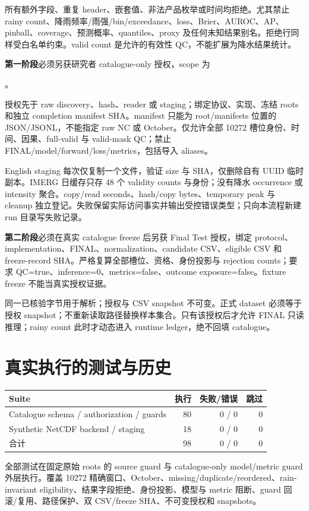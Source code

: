 \documentclass[11pt,a4paper]{ctexart}
\newcommand{\code}[1]{\texttt{\detokenize{#1}}}
\begin{document}
所有额外字段、重复 header、嵌套值、非法产品枚举或时间均拒绝。尤其禁止 rainy count、降雨频率/雨强/bin/exceedance、loss、Brier、AUROC、AP、pinball、coverage、预测概率、quantiles、proxy 及任何未知结果别名。拒绝行同样受白名单约束。valid count 是允许的有效性 QC，不能扩展为降水结果统计。

\textbf{第一阶段}必须另获研究者 catalogue-only 授权，scope 为\par
\code{B0_2025_FINAL_TEST_CATALOGUE_ONLY}。\par
授权先于 raw discovery、hash、reader 或 staging；绑定协议、实现、冻结 roots 和独立 completion manifest SHA。manifest 只能为 root/manifests 位置的 JSON/JSONL，不能指定 raw NC 或 October。仅允许全部 10272 槽位身份、时间、因果、full-valid 与 valid-mask QC；禁止 FINAL/model/forward/loss/metrics，包括导入 aliases。

English staging 每次仅复制一个文件，验证 size 与 SHA，仅删除自有 UUID 临时副本。IMERG 日缓存只存 48 个 validity counts 与身份；没有降水 occurrence 或 intensity 聚合。copy/read seconds、hash/copy bytes、temporary peak 与 cleanup 独立登记。失败保留实际访问事实并输出受控错误类型；只向本流程新建 run 目录写失败记录。

\textbf{第二阶段}必须在真实 catalogue freeze 后另获 Final Test 授权，绑定 protocol、implementation、FINAL、normalization、candidate CSV、eligible CSV 和 freeze-record SHA。严格复算全部槽位、资格、身份投影与 rejection counts；要求 QC=true、inference=0、metrics=false、outcome exposure=false。fixture freeze 不能当真实授权证据。

同一已核验字节用于解析；授权与 CSV snapshot 不可变。正式 dataset 必须等于授权 snapshot；不重新读取路径替换样本集合。只有该授权后才允许 FINAL 只读推理；rainy count 此时才动态进入 runtime ledger，绝不回填 catalogue。

\newpage
\section*{真实执行的测试与历史}
\begin{tabular}{lrrr}
\toprule Suite & 执行 & 失败/错误 & 跳过\\\midrule
Catalogue schema / authorization / guards & 80 & 0 / 0 & 0\\
Synthetic NetCDF backend / staging & 18 & 0 / 0 & 0\\
合计 & 98 & 0 / 0 & 0\\\bottomrule
\end{tabular}

全部测试在固定原始 roots 的 source guard 与 catalogue-only model/metric guard 外层执行。覆盖 10272 精确窗口、October、missing/duplicate/reordered、rain-invariant eligibility、结果字段拒绝、身份投影、模型与 metric 阻断、guard 回滚/复用、路径保护、双 CSV/freeze SHA、不可变授权和 snapshots。
\end{document}
